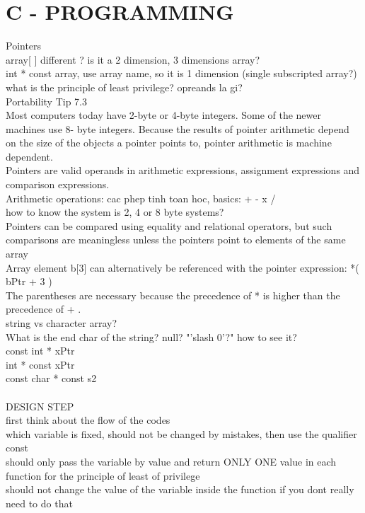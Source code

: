 \section{C - PROGRAMMING}
Pointers\\
array[ ] different ? is it a 2 dimension, 3 dimensions array?\\
int * const array, use array name, so it is 1 dimension (single subscripted array?)\\
what is the principle of least privilege?
opreands la gi?\\
Portability Tip 7.3\\
Most computers today have 2-byte or 4-byte integers. Some of the newer machines use 8-
byte integers. Because the results of pointer arithmetic depend on the size of the objects a
pointer points to, pointer arithmetic is machine dependent.\\
Pointers are valid operands in arithmetic expressions, assignment expressions and comparison expressions.\\
Arithmetic operations: cac phep tinh toan hoc, basics: + - x / 
\\
how to know the system is 2, 4 or 8 byte systems?
\\
Pointers can be compared using equality and relational operators, but such comparisons are meaningless unless the pointers point to elements of the same array
\\
Array element b[3] can alternatively be referenced with the pointer expression: *( bPtr + 3 )\\
The parentheses are necessary because the precedence of * is higher than the precedence of + .
\\
string vs character array?\\
What is the end char of the string? null? "'slash 0'?" how to see it?\\
const int * xPtr \\
int * const xPtr \\
const char * const s2\\
\\DESIGN STEP
\\first think about the flow of the codes
\\which variable is fixed, should not be changed by mistakes, then use the qualifier const
\\should only pass the variable by value and return ONLY ONE value in each function for the principle of least of privilege
\\should not change the value of the variable inside the function if you dont really need to do that

